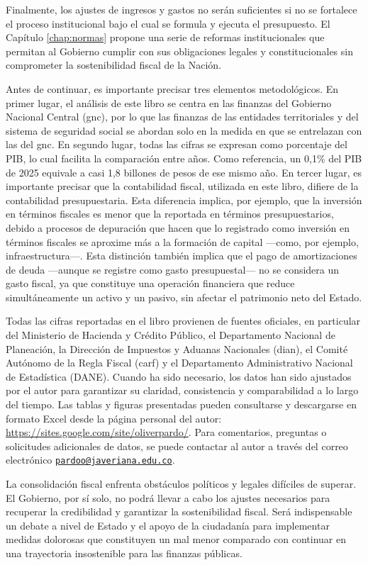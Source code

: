 \begin{introduction}
Finalmente, los ajustes de ingresos y gastos no serán suficientes si no se fortalece el proceso institucional bajo el cual se formula y ejecuta el presupuesto. El Capítulo \ref{chap:normas} propone una serie de reformas institucionales que permitan al Gobierno cumplir con sus obligaciones legales y constitucionales sin comprometer la sostenibilidad fiscal de la Nación.

Antes de continuar, es importante precisar tres elementos metodológicos. En primer lugar, el análisis de este libro se centra en las finanzas del Gobierno Nacional Central (\gls{gnc}), por lo que las finanzas de las entidades territoriales y del sistema de seguridad social se abordan solo en la medida en que se entrelazan con las del \gls{gnc}. En segundo lugar, todas las cifras se expresan como porcentaje del PIB, lo cual facilita la comparación entre años. Como referencia, un 0,1\% del PIB de 2025 equivale a casi 1,8 billones de pesos de ese mismo año. En tercer lugar, es importante precisar que la contabilidad fiscal, utilizada en este libro, difiere de la contabilidad presupuestaria. Esta diferencia implica, por ejemplo, que la inversión en términos fiscales es menor que la reportada en términos presupuestarios, debido a procesos de depuración que hacen que lo registrado como inversión en términos fiscales se aproxime más a la formación de capital —como, por ejemplo, infraestructura—. Esta distinción también implica que el pago de amortizaciones de deuda —aunque se registre como gasto presupuestal— no se considera un gasto fiscal, ya que constituye una operación financiera que reduce simultáneamente un activo y un pasivo, sin afectar el patrimonio neto del Estado.

Todas las cifras reportadas en el libro provienen de fuentes oficiales, en particular del Ministerio de Hacienda y Crédito Público, el Departamento Nacional de Planeación, la Dirección de Impuestos y Aduanas Nacionales (\gls{dian}), el Comité Autónomo de la Regla Fiscal (\gls{carf}) y el Departamento Administrativo Nacional de Estadística (DANE). Cuando ha sido necesario, los datos han sido ajustados por el autor para garantizar su claridad, consistencia y comparabilidad a lo largo del tiempo. Las tablas y figuras presentadas pueden consultarse y descargarse en formato Excel desde la página personal del autor: \href{https://sites.google.com/site/oliverpardo/}{https://sites.google.com/site/oliverpardo/}. Para comentarios, preguntas o solicitudes adicionales de datos, se puede contactar al autor a través del correo electrónico \href{mailto:pardoo@javeriana.edu.co}{\texttt{pardoo@javeriana.edu.co}}.

La consolidación fiscal enfrenta obstáculos políticos y legales difíciles de superar. El Gobierno, por sí solo, no podrá llevar a cabo los ajustes necesarios para recuperar la credibilidad y garantizar la sostenibilidad fiscal. Será indispensable un debate a nivel de Estado y el apoyo de la ciudadanía para implementar medidas dolorosas que constituyen un mal menor comparado con continuar en una trayectoria insostenible para las finanzas públicas.


\end{introduction}
